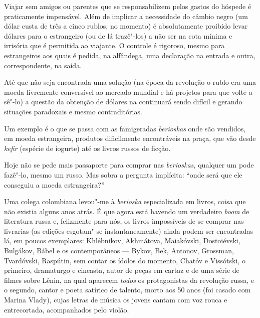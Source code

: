 Viajar sem amigos ou parentes que se responsabilizem pelos gastos do
hóspede é praticamente impensável. Além de implicar a necessidade do
câmbio negro (um dólar custa de três a cinco rublos, no momento) é
absolutamente proibido levar dólares para o estrangeiro (ou de lá
trazê"-los) a não ser na cota mínima e irrisória que é permitida ao
viajante. O controle é rigoroso, mesmo para estrangeiros aos quais é
pedida, na alfândega, uma declaração na entrada e outra, correspondente,
na saída.

Até que não seja encontrada uma solução (na época da revolução o rublo
era uma moeda livremente conversível ao mercado mundial e há projetos
para que volte a sê"-lo) a questão da obtenção de dólares na 
continuará sendo difícil e gerando situações paradoxais e mesmo
contraditórias.

Um exemplo é o que se passa com as famigeradas \emph{berioskas} onde são
vendidos, em moeda estrangeira, produtos dificilmente encontráveis na
praça, que vão desde \emph{kefir} (espécie de iogurte) até os livros
russos de ficção.

Hoje não se pede mais passaporte para comprar nas \emph{berioskas,}
qualquer um pode fazê"-lo, mesmo um russo. Mas sobra a pergunta
implícita: ``onde será que ele conseguiu a moeda estrangeira?''

Uma colega colombiana levou"-me à \emph{berioska} especializada em
livros, coisa que não existia alguns anos atrás. É que agora está
havendo um verdadeiro \emph{boom} de literatura russa e, felizmente para
nós, os livros impossíveis de se comprar nas livrarias (as edições
esgotam"-se instantaneamente) ainda podem ser encontradas lá, em poucos
exemplares: Khlébnikov, Akhmátova, Maiakóvski, Dostoiévski, Bulgákov,
Bábel e os contemporâneos --- Bykov, Bek, Antonov, Grossman, Tvardóvski,
Raspútin, sem contar os ídolos do momento, Chatóv e Vissótski, o
primeiro, dramaturgo e cineasta, autor de peças em cartaz e de uma série
de filmes sobre Lênin, na qual aparecem \emph{todos} os protagonistas da
revolução russa, e o segundo, cantor e poeta satírico de talento, morto
aos 50 anos (foi casado com Marina Vlady), cujas letras de música os
jovens cantam com voz rouca e entrecortada, acompanhados pelo violão.

